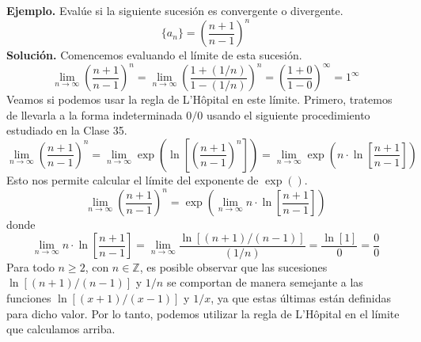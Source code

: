\documentclass[12pt]{article}
\begin{document}
\textbf{Ejemplo.} Evalúe si la siguiente sucesión es convergente o divergente.
\[
  \{a_{n}\} = \left(\frac{n + 1}{n - 1}\right)^{n}
\]
\textbf{Solución.} Comencemos evaluando el límite de esta sucesión.
\[
  \lim_{n \to \infty} \left(\frac{n + 1}{n - 1}\right)^{n} = \lim_{n \to \infty} \left(\frac{1 + (1/n)}{1 - (1/n)}\right)^{n}
                                                           = \left(\frac{1 + 0}{1 - 0}\right)^{\infty}
                                                           = 1^{\infty}
\]
Veamos si podemos usar la regla de L'Hôpital en este límite. Primero, tratemos de llevarla a la forma indeterminada $0/0$ usando el siguiente procedimiento estudiado en la Clase 35.
\[
\lim_{n \to \infty} \left(\frac{n + 1}{n - 1}\right)^{n} = \lim_{n \to \infty} \exp\left(\ln\left[\left(\frac{n + 1}{n - 1}\right)^{n}\right]\right)
                                                         = \lim_{n \to \infty} \exp\left(n \cdot \ln\left[\frac{n + 1}{n - 1}\right]\right)
\]
Esto nos permite calcular el límite del exponente de $\exp()$.
\[
\lim_{n \to \infty} \left(\frac{n + 1}{n - 1}\right)^{n} = \exp\left(\lim_{n \to \infty} n \cdot \ln\left[\frac{n + 1}{n - 1}\right]\right)
\]
donde
\[
\lim_{n \to \infty} n \cdot \ln\left[\frac{n + 1}{n - 1}\right] = \lim_{n \to \infty} \frac{\ln[(n + 1)/(n - 1)]}{(1/n)}
                                                                = \frac{\ln[1]}{0}
                                                                = \frac{0}{0}
\]
Para todo $n \geq 2$, con $n \in \mathbb{Z}$, es posible observar que las sucesiones $\ln[(n + 1)/(n - 1)]$ y $1/n$ se comportan de manera semejante a las funciones $\ln[(x + 1)/(x - 1)]$ y $1/x$, ya que estas últimas están definidas para dicho valor. Por lo tanto, podemos utilizar la regla de L'Hôpital en el límite que calculamos arriba.
\end{document}
